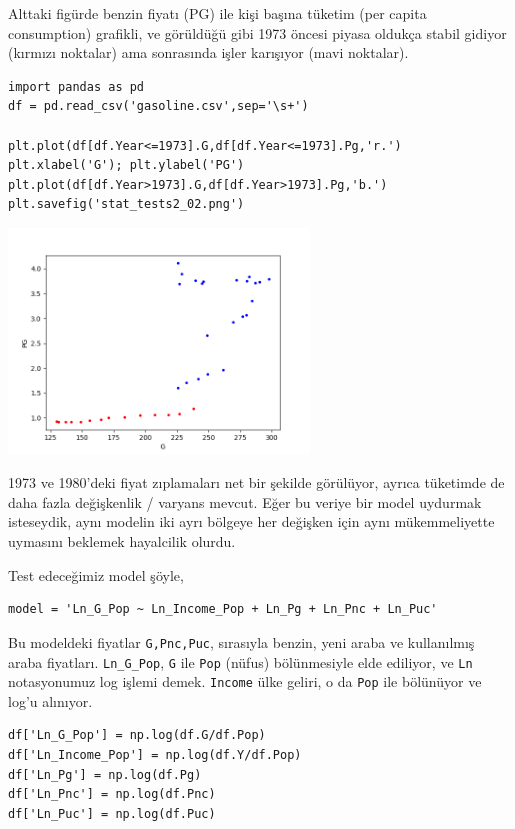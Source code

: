 \documentclass[12pt,fleqn]{article}\usepackage{../../common}
\begin{document}
Alttaki figürde benzin fiyatı (PG) ile kişi başına tüketim (per capita
consumption) grafikli, ve görüldüğü gibi 1973 öncesi piyasa oldukça stabil
gidiyor (kırmızı noktalar) ama sonrasında işler karışıyor (mavi noktalar).

\begin{verbatim}
import pandas as pd
df = pd.read_csv('gasoline.csv',sep='\s+')

plt.plot(df[df.Year<=1973].G,df[df.Year<=1973].Pg,'r.')
plt.xlabel('G'); plt.ylabel('PG')
plt.plot(df[df.Year>1973].G,df[df.Year>1973].Pg,'b.')
plt.savefig('stat_tests2_02.png')
\end{verbatim}

\includegraphics[height=6cm]{stat_tests2_02.png}

1973 ve 1980'deki fiyat zıplamaları net bir şekilde görülüyor, ayrıca
tüketimde de daha fazla değişkenlik / varyans mevcut. Eğer bu veriye bir
model uydurmak isteseydik, aynı modelin iki ayrı bölgeye her değişken için
aynı mükemmeliyette uymasını beklemek hayalcilik olurdu.

Test edeceğimiz model şöyle, 

\begin{verbatim}
model = 'Ln_G_Pop ~ Ln_Income_Pop + Ln_Pg + Ln_Pnc + Ln_Puc'
\end{verbatim}

Bu modeldeki fiyatlar \verb!G,Pnc,Puc!, sırasıyla benzin, yeni araba ve
kullanılmış araba fiyatları. \verb!Ln_G_Pop!, \verb!G! ile \verb!Pop!
(nüfus) bölünmesiyle elde ediliyor, ve \verb!Ln! notasyonumuz log işlemi
demek. \verb!Income! ülke geliri, o da \verb!Pop! ile bölünüyor ve log'u
alınıyor.

\begin{verbatim}
df['Ln_G_Pop'] = np.log(df.G/df.Pop)
df['Ln_Income_Pop'] = np.log(df.Y/df.Pop)
df['Ln_Pg'] = np.log(df.Pg)
df['Ln_Pnc'] = np.log(df.Pnc)
df['Ln_Puc'] = np.log(df.Puc)
\end{verbatim}
\end{document}
